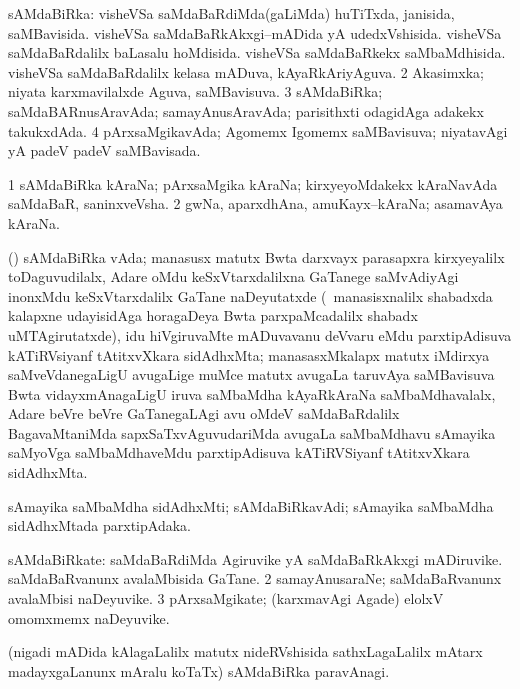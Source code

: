 \bentry
{}
\gl{\gu}
\bmng
\bnum
{} sAMdaBiRka: 
\banum
{} visheVSa saMdaBaRdiMda(gaLiMda) huTiTxda, janisida, saMBavisida. 
 visheVSa saMdaBaRkAkxgi--mADida yA udedxVshisida. 
 visheVSa saMdaBaRdalilx baLasalu hoMdisida. 
 visheVSa saMdaBaRkekx saMbaMdhisida. 
 visheVSa saMdaBaRdalilx kelasa mADuva, kAyaRkAriyAguva. 
\eanum
\numie
\num{2} Akasimxka; niyata karxmavilalxde Aguva, saMBavisuva. 
\num{3} sAMdaBiRka; saMdaBARnusAravAda; samayAnusAravAda; parisithxti odagidAga adakekx takukxdAda. 
\num{4} pArxsaMgikavAda; Agomemx Igomemx saMBavisuva; niyatavAgi yA padeV padeV saMBavisada. 
\enum
\emng
\eentry

\bentry
{}
\gl{\nA}
\bmng
\bnum
\num{1} sAMdaBiRka kAraNa; pArxsaMgika kAraNa; kirxyeyoMdakekx kAraNavAda saMdaBaR, saninxveVsha. 
\num{2} gwNa, aparxdhAna, amuKayx--kAraNa; asamavAya kAraNa. 
\enum
\emng
\eentry

\bentry
{}
\gl{\nA}
\bmng
(\tashA) sAMdaBiRka vAda; manasusx matutx Bwta darxvayx parasapxra kirxyeyalilx toDaguvudilalx, Adare oMdu keSxVtarxdalilxna GaTanege saMvAdiyAgi inonxMdu keSxVtarxdalilx GaTane naDeyutatxde (\udA\ manasisxnalilx shabadxda kalapxne udayisidAga horagaDeya Bwta parxpaMcadalilx shabadx uMTAgirutatxde), idu hiVgiruvaMte mADuvavanu deVvaru eMdu parxtipAdisuva kATiRVsiyanf tAtitxvXkara sidAdhxMta; manasasxMkalapx matutx iMdirxya saMveVdanegaLigU avugaLige muMce matutx avugaLa taruvAya saMBavisuva Bwta vidayxmAnagaLigU iruva saMbaMdha kAyaRkAraNa saMbaMdhavalalx, Adare beVre beVre GaTanegaLAgi avu oMdeV saMdaBaRdalilx BagavaMtaniMda sapxSaTxvAguvudariMda avugaLa saMbaMdhavu sAmayika saMyoVga saMbaMdhaveMdu parxtipAdisuva kATiRVSiyanf tAtitxvXkara sidAdhxMta. 
\emng
\eentry

\bentry
{}
\gl{\nA}
\bmng
sAmayika saMbaMdha sidAdhxMti; sAMdaBiRkavAdi; sAmayika saMbaMdha sidAdhxMtada parxtipAdaka. 
\emng
\eentry

\bentry
{}
\gl{\nA}
\bmng
\bnum
{} sAMdaBiRkate: 
\banum
{} saMdaBaRdiMda Agiruvike yA saMdaBaRkAkxgi mADiruvike. 
 saMdaBaRvanunx avalaMbisida GaTane. 
\eanum
\numie
\num{2} samayAnusaraNe; saMdaBaRvanunx avalaMbisi naDeyuvike. 
\num{3} pArxsaMgikate; (karxmavAgi Agade) elolxV omomxmemx naDeyuvike. 
\enum
\emng
\eentry

\bentry
{}
\gl{\nA}
\bmng
(nigadi mADida kAlagaLalilx matutx nideRVshisida sathxLagaLalilx mAtarx madayxgaLanunx mAralu koTaTx) sAMdaBiRka paravAnagi. 
\emng
\eentry

